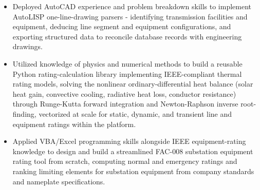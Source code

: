 \documentclass[10pt, letterpaper]{article}
\newenvironment{rlist}{%
  \begin{itemize}[leftmargin=1.4em, itemsep=1pt, topsep=2pt, parsep=0pt]%
}{%
  \end{itemize}%
}
\begin{document}
\begin{rlist}
  \item Deployed AutoCAD experience and problem breakdown skills to implement AutoLISP one-line-drawing parsers - identifying transmission facilities and equipment, deducing line segment and equipment configurations, and exporting structured data to reconcile database records with engineering drawings.
  \item Utilized knowledge of physics and numerical methods to build a reusable Python rating-calculation library implementing IEEE-compliant thermal rating models, solving the nonlinear ordinary-differential heat balance (solar heat gain, convective cooling, radiative heat loss, conductor resistance) through Runge-Kutta forward integration and Newton-Raphson inverse root-finding, vectorized at scale for static, dynamic, and transient line and equipment ratings within the platform.
  \item Applied VBA/Excel programming skills alongside IEEE equipment-rating knowledge to design and build a streamlined FAC-008 substation equipment rating tool from scratch, computing normal and emergency ratings and ranking limiting elements for substation equipment from company standards and nameplate specifications.
\end{rlist}
\end{document}
